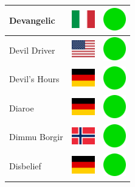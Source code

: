 \documentclass[12pt, a4paper, twoside]{report}
\begin{document}
\begin{center}
\begin{longtable}{|p{5cm}|p{2cm}|p{2cm}|}
 Devangelic                                                 & \includegraphics[width=1cm]{../4x3/it} &   \includegraphics[width=1cm]{../likes/y} \\ \hline
 Devil Driver                                               & \includegraphics[width=1cm]{../4x3/us} &   \includegraphics[width=1cm]{../likes/y} \\ \hline
 Devil's Hours                                              & \includegraphics[width=1cm]{../4x3/de} &   \includegraphics[width=1cm]{../likes/y} \\ \hline
 Diaroe                                                     & \includegraphics[width=1cm]{../4x3/de} &   \includegraphics[width=1cm]{../likes/y} \\ \hline
 Dimmu Borgir                                               & \includegraphics[width=1cm]{../4x3/no} &   \includegraphics[width=1cm]{../likes/y} \\ \hline
 Disbelief                                                  & \includegraphics[width=1cm]{../4x3/de} &   \includegraphics[width=1cm]{../likes/y} \\ \hline

\end{longtable}
\end{center}
\end{document}
